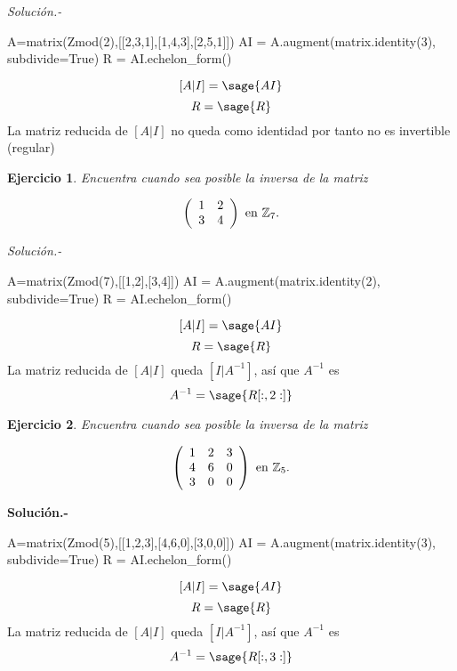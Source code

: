 \documentclass{amsart}
\newtheorem{ejer}{Ejercicio}
\def\z{\mathbb{Z}}
\begin{document}
{\it Soluci\'on.- }

\begin{sageblock}
A=matrix(Zmod(2),[[2,3,1],[1,4,3],[2,5,1]])
AI = A.augment(matrix.identity(3), subdivide=True)
R = AI.echelon_form()
\end{sageblock}

$$
[A|I] = \sage{AI}
$$
$$
R = \sage{R}
$$
La matriz reducida de $[A|I]$ no queda como identidad por tanto no es invertible (regular)


\begin{ejer} Encuentra cuando sea posible la inversa de la matriz

\[ \left( \begin{array}{cc}
1 & 2 \\
3 & 4 \end{array} \right) \ \hbox{en} \ \z _{7}. \]

\end{ejer}

{\it Soluci\'on.- }

\begin{sageblock}
A=matrix(Zmod(7),[[1,2],[3,4]])
AI = A.augment(matrix.identity(2), subdivide=True)
R = AI.echelon_form()
\end{sageblock}

$$
[A|I] = \sage{AI}
$$
$$
R = \sage{R}
$$
La matriz reducida de $[A|I]$ queda $[I|A^{-1}]$, así que $A^{-1}$ es
$$
A^{-1} = \sage{R[:, 2:]}
$$


\begin{ejer} Encuentra cuando sea posible la inversa de la matriz

\[ \left( \begin{array}{cccc}
1 & 2 & 3 \\
4 & 6 & 0 \\
3 & 0 & 0  \end{array} \right) \ \hbox{en} \ \z _{5}. \]

\end{ejer}
{\bf Solución.-}

\begin{sageblock}
A=matrix(Zmod(5),[[1,2,3],[4,6,0],[3,0,0]])
AI = A.augment(matrix.identity(3), subdivide=True)
R = AI.echelon_form()
\end{sageblock}

$$
[A|I] = \sage{AI}
$$
$$
R = \sage{R}
$$
La matriz reducida de $[A|I]$ queda $[I|A^{-1}]$, así que $A^{-1}$ es
$$
A^{-1} = \sage{R[:, 3:]}
$$

\end{document}
